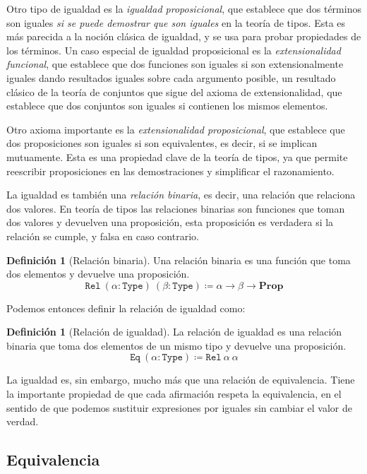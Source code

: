 \documentclass[
  a4paper, 
  10pt, 
  parskip=half, 
  toc=bibliography,
]{scrbook}
\theoremstyle{definition}
\theoremstyle{bolddef}
\newtheorem{definition}[theorem]{Definición}
\newcommand{\funfont}[1]{\texttt{#1}}
\newcommand{\Prop}{\mathbf{Prop}}
\begin{document}
Otro tipo de igualdad es la \emph{igualdad proposicional}, que establece que dos
términos son iguales \emph{si se puede demostrar que son iguales} en la teoría de
tipos. Esta es más parecida a la noción clásica de igualdad, y se usa para
probar propiedades de los términos. Un caso especial de igualdad proposicional es
la \emph{extensionalidad funcional}, que establece que dos funciones son
iguales si son extensionalmente iguales dando resultados iguales sobre cada argumento posible,
un resultado clásico de la teoría de conjuntos que sigue del axioma de extensionalidad, 
que establece que dos conjuntos son iguales si contienen los mismos elementos.

Otro axioma importante es la \emph{extensionalidad proposicional}, que
establece que dos proposiciones son iguales si son equivalentes, es decir, si se
implican mutuamente. Esta es una propiedad clave de la teoría de tipos, ya que
permite reescribir proposiciones en las demostraciones y simplificar el razonamiento.

La igualdad es también una \emph{relación binaria}, es decir, una relación que relaciona
dos valores. En teoría de tipos las relaciones binarias son funciones
que toman dos valores y devuelven una proposición, esta proposición es verdadera
si la relación se cumple, y falsa en caso contrario.

\begin{definition}[Relación binaria]
  Una relación binaria es una función que toma dos elementos y devuelve una
  proposición.
  \[
  \funfont{Rel} \ (\alpha : \texttt{Type}) \ (\beta : \texttt{Type}) 
    \coloneqq \alpha \to \beta \to \Prop 
  \]
\end{definition}

Podemos entonces definir la relación de igualdad como:

\begin{definition}[Relación de igualdad]
  La relación de igualdad es una relación binaria que toma dos elementos de un
  mismo tipo y devuelve una proposición.
  \[
  \funfont{Eq} \ (\alpha: \texttt{Type}) \coloneqq \texttt{Rel} \ \alpha \ \alpha  
  \]
\end{definition}

La igualdad es, sin embargo, mucho más que una relación de equivalencia. Tiene la
importante propiedad de que cada afirmación respeta la equivalencia, en el sentido
de que podemos sustituir expresiones por iguales sin cambiar el valor de verdad.

\subsection{Equivalencia}
\end{document}
